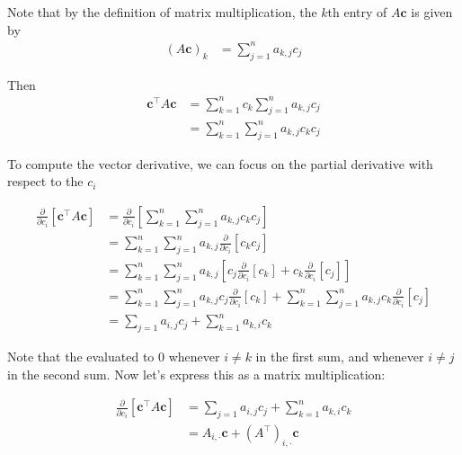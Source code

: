 \documentclass[12pt]{article}
\begin{document}

\begin{enumerate}


Note that by the definition of matrix multiplication, the $k$th entry of $A\mathbf{c}$ is given by
\begin{align*}
	(A\mathbf{c})_k&=\sum_{j=1}^{n}a_{k,j}c_j
\end{align*}

Then
\begin{align*}
	\mathbf{c}^\top A\mathbf{c} &= \sum_{k=1}^{n}c_k\sum_{j=1}^{n}a_{k,j}c_j\\
	&=\sum_{k=1}^{n}\sum_{j=1}^{n}a_{k,j}c_kc_j
\end{align*}

To compute the vector derivative, we can focus on the partial derivative with
respect to the $c_i$

\begin{align*}
	\frac{\partial}{\partial c_i}[\mathbf{c}^\top A\mathbf{c}]
	&=\frac{\partial}{\partial c_i}
	\left[
	\sum_{k=1}^{n}\sum_{j=1}^{n}a_{k,j}c_kc_j
	\right]\\
	&=\sum_{k=1}^{n}\sum_{j=1}^{n}a_{k,j}\frac{\partial}{\partial c_i}[c_kc_j]\\
	&=\sum_{k=1}^{n}\sum_{j=1}^{n}a_{k,j}\left[c_j \frac{\partial}{\partial c_i}[c_k]
	+c_k\frac{\partial}{\partial c_i}[c_j] \right]\\
	&=\sum_{k=1}^{n}\sum_{j=1}^{n}a_{k,j}c_j\frac{\partial}{\partial c_i}[c_k]
	+\sum_{k=1}^{n}\sum_{j=1}^{n}a_{k,j}c_k\frac{\partial}{\partial c_i}[c_j]\\
	&=\sum_{j=1}a_{i,j}c_j+\sum_{k=1}^{n}a_{k,i}c_k
\end{align*}

Note that the evaluated to $0$ whenever $i\neq k$ in the first sum, and whenever
$i\neq j$ in the second sum. Now let's express this as a matrix multiplication:

\begin{align*}
	\frac{\partial}{\partial c_i}[\mathbf{c}^\top A \mathbf{c}]
	&=\sum_{j=1}a_{i,j}c_j+\sum_{k=1}^{n}a_{k,i}c_k\\
	&=A_{i,\cdot}\mathbf{c}+(A^\top)_{i,\cdot}\mathbf{c}
\end{align*}


\end{enumerate}
\end{document}
